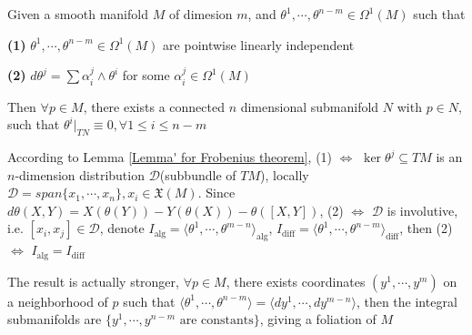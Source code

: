 \documentclass[../main.tex]{subfiles}
\begin{document}
\begin{theorem}
Given a smooth manifold $M$ of dimesion $m$, and $\theta^1,\cdots,\theta^{n-m}\in\Omega^1(M)$ such that \par
\textbf{(1) }$\theta^1,\cdots,\theta^{n-m}\in\Omega^1(M)$ are pointwise linearly independent \par
\textbf{(2) }$d\theta^j=\sum\alpha^j_i\wedge\theta^i$ for some $\alpha^j_i\in\Omega^1(M)$ \par
Then $\forall p\in M$, there exists a connected $n$ dimensional submanifold $N$ with $p\in N$, such that $\theta^i|_{TN}\equiv0,\forall 1\le i\leq n-m$ \par
According to Lemma \ref{Lemma' for Frobenius theorem}, (1) $\Leftrightarrow$ $\ker\theta^j\subseteq TM$ is an $n$-dimension distribution $\mathscr D$(subbundle of $TM$), locally $\mathscr D=span\{x_1,\cdots,x_n\}, x_i\in\mathfrak X(M)$. Since $d\theta(X,Y)=X(\theta(Y))-Y(\theta(X))-\theta([X,Y])$, (2) $\Leftrightarrow$ $\mathscr D$ is involutive, i.e. $[x_i,x_j]\in\mathscr D$, denote $I_{\mathrm{alg}}=\langle \theta^1,\cdots,\theta^{m-n}\rangle_{\mathrm{alg}}$, $I_{\mathrm{diff}}=\langle \theta^1,\cdots,\theta^{n-m}\rangle_{\mathrm{diff}}$, then (2) $\Leftrightarrow$ $I_{\mathrm{alg}}=I_{\mathrm{diff}}$ \par
The result is actually stronger, $\forall p\in M$, there exists coordinates $(y^1,\cdots,y^m)$ on a neighborhood of $p$ such that $\langle\theta^1,\cdots,\theta^{n-m}\rangle=\langle dy^1,\cdots,dy^{m-n}\rangle$, then the integral submanifolds are $\{y^1,\cdots,y^{n-m}\text{ are constants}\}$, giving a foliation of $M$
\end{theorem}
\end{document}
